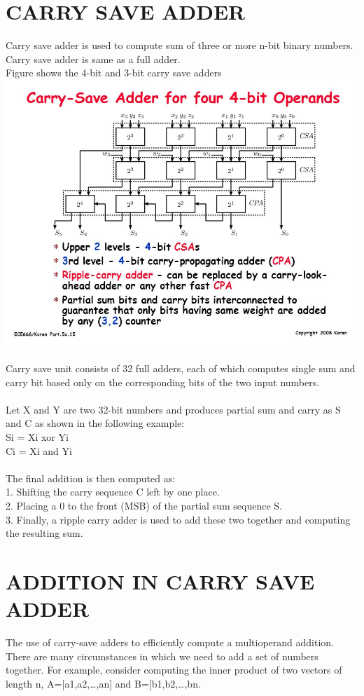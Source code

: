 \documentclass[12pt]{article}
\begin{document}
\section{CARRY SAVE ADDER}
Carry  save  adder  is  used  to compute  sum  of  three  or  more  n-bit  binary  numbers. \\ Carry save 
adder is  same  as  a  full adder.\\ Figure shows the 4-bit and 3-bit carry save adders \\\includegraphics[scale=0.6]{csa-adder.jpg}\\
\\Carry save unit consists of 32 full adders, each of which computes 
single sum and carry  bit  based only  on  the corresponding bits of  the  two input  numbers.\\ \\ Let  X 
and Y  are two 32-bit  numbers and produces partial sum and carry  as S and C as  shown in the 
following example:\\ 
Si = Xi xor Yi\\ 
Ci = Xi and Yi \\ \\
The final addition is then computed as: \\
1. Shifting the carry sequence C left by one place.\\ 
2. Placing a 0 to the front (MSB) of the partial sum sequence S.\\ 
3. Finally, a ripple carry adder is used to add these two together and computing the resulting sum.\cite{csa} \\
\section{ADDITION IN CARRY SAVE ADDER}
The use of carry-save adders to efficiently compute a multioperand addition.
There are many circumstances in which we need to add a set of numbers together. For example, consider computing the inner product of two vectors of length n, A=[a1,a2,…,an]
and B=[b1,b2,…,bn.
\end{document}
